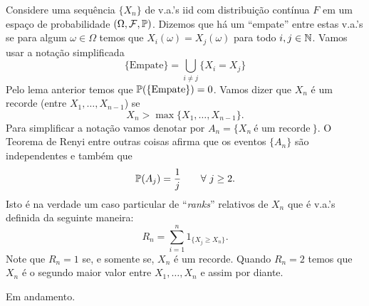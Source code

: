 \bigskip

Considere uma sequência $\{X_n\}$ de v.a.'s iid 
com distribuição contínua $F$ em um espaço de probabilidade
$(\Omega,\F,\P)$. 
Dizemos que há um ``empate'' entre estas v.a.'s  se
para algum $\omega\in\Omega$ temos que
$X_i(\omega)=X_j(\omega)$ para todo $i,j\in\N$.
Vamos usar a notação simplificada 
	\[
		\{ \text{Empate} \}
		=
		\bigcup_{i\neq j} \{X_i=X_j\}	
	\]
Pelo lema anterior temos que
$\P(\{\text{Empate}\})=0$.
Vamos dizer que $X_n$ é um recorde (entre $X_1,\ldots,X_{n-1}$)
se 
	\[ 
	X_n>\max\{X_1,\ldots,X_{n-1}\}.
	\]
Para simplificar a notação vamos denotar por 
$A_n = \{X_n \ \text{é um recorde}\ \}$.
O Teorema de Renyi entre outras coisas afirma que
os eventos $\{A_n\}$ são independentes e também que 
	\[
		\P(A_j)=\frac{1}{j}
		\qquad 
		\forall\ j\geq 2.
	\]
Isto é na verdade um caso particular de ``{\it ranks}''
relativos de $X_n$ que é v.a.'s definida da seguinte maneira:
	\[
		R_n = \sum_{i=1}^n 1_{\{X_j\geq X_n\}}.
	\]
Note que $R_n=1$ se, e somente se, $X_n$ é um recorde.
Quando $R_n=2$ temos que $X_n$ é o segundo maior 
valor entre $X_1,\ldots,X_n$ e assim por diante. 








\begin{center}
	{\red Em andamento.}
\end{center}


